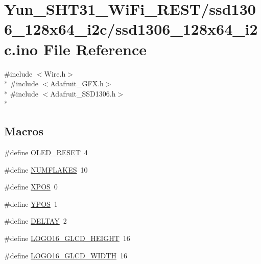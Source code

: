 \hypertarget{ssd1306__128x64__i2c_8ino}{\section{Yun\-\_\-\-S\-H\-T31\-\_\-\-Wi\-Fi\-\_\-\-R\-E\-S\-T/ssd1306\-\_\-128x64\-\_\-i2c/ssd1306\-\_\-128x64\-\_\-i2c.ino File Reference}
\label{ssd1306__128x64__i2c_8ino}
}
{\ttfamily \#include $<$Wire.\-h$>$}\\*
{\ttfamily \#include $<$Adafruit\-\_\-\-G\-F\-X.\-h$>$}\\*
{\ttfamily \#include $<$Adafruit\-\_\-\-S\-S\-D1306.\-h$>$}\\*
\subsection*{Macros}
\begin{DoxyCompactItemize}
\item 
\#define \hyperlink{ssd1306__128x64__i2c_8ino_a619e07239fb3b9b14d40646ab41d5b4f}{O\-L\-E\-D\-\_\-\-R\-E\-S\-E\-T}~4
\item 
\#define \hyperlink{ssd1306__128x64__i2c_8ino_a1d77579612ad82d1e371a721f4c626c7}{N\-U\-M\-F\-L\-A\-K\-E\-S}~10
\item 
\#define \hyperlink{ssd1306__128x64__i2c_8ino_a389f7aa21a1b492a5aa192f19857be6a}{X\-P\-O\-S}~0
\item 
\#define \hyperlink{ssd1306__128x64__i2c_8ino_abb6015d51c0c8263883ec6c69a115fb6}{Y\-P\-O\-S}~1
\item 
\#define \hyperlink{ssd1306__128x64__i2c_8ino_a242f273ef9c6483550561ac19a34ab5b}{D\-E\-L\-T\-A\-Y}~2
\item 
\#define \hyperlink{ssd1306__128x64__i2c_8ino_adccb05dba1fa50fac1f605f35dc6ad45}{L\-O\-G\-O16\-\_\-\-G\-L\-C\-D\-\_\-\-H\-E\-I\-G\-H\-T}~16
\item 
\#define \hyperlink{ssd1306__128x64__i2c_8ino_a1263a11c527705fd8f64e25739477c82}{L\-O\-G\-O16\-\_\-\-G\-L\-C\-D\-\_\-\-W\-I\-D\-T\-H}~16
\end{DoxyCompactItemize}
